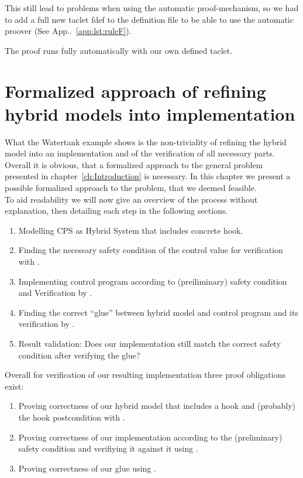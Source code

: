 This still lead to problems when using the automatic proof-mechanism, so we had to add a full new taclet fdef to the definition file to be able to use the automatic proover (See App..~\ref{app:lst:ruleF}).

The proof runs fully automatically with our own defined taclet.

\chapter{Formalized approach of refining hybrid models into implementation}
\label{ch:Process}

What the Watertank example shows is the non-triviality of refining the hybrid model into an implementation and of the verification of all necessary parts. Overall it is obvious, that a formalized approach to the general problem presented in chapter~\ref{ch:Introduction} is necessary. In this chapter we present a possible formalized approach to the problem, that we deemed feasible.
\\


To aid readability we will now give an overview of the process without explanation, then detailing each step in the following sections. 

\begin{enumerate}
	\item Modelling CPS as Hybrid System that includes concrete hook.
	\item Finding the necessary safety condition of the control value for verification with \keym.
	\item Implementing control program according to (preiliminary) safety condition and Verification by \key.		
	\item Finding the correct ``glue'' between hybrid model and control program and its verification by \keym.
	\item Result validation: Does our implementation still match the correct safety condition after verifying the glue?
\end{enumerate}

Overall for verification of our resulting implementation three proof obligations exist:
\begin{enumerate}[label=\roman*]
	\item Proving correctness of our hybrid model that includes a hook and (probably) the hook postcondition with \keym.
	\item Proving correctness of our implementation according to the (preliminary) safety condition and verifiying it against it using \key.
	\item Proving correctness of our glue using \keym.
\end{enumerate} 

